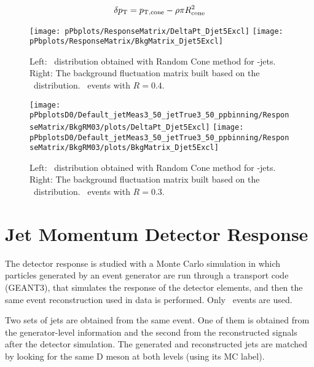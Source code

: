 \begin{equation}
\delta p_{\rm T} = p_{\rm T, cone} - \rho \pi R_{\rm cone}^{2}
\label{edeltapt}
\end{equation}

\begin{figure}[bth]
\centering
\texttt{[image: pPbplots/ResponseMatrix/DeltaPt\_Djet5Excl]}
\texttt{[image: pPbplots/ResponseMatrix/BkgMatrix\_Djet5Excl]}
\caption{Left: \deltapt\ distribution obtained with Random Cone method for \Dstar-jets. Right: The background fluctuation matrix built based on the \deltapt\ distribution. \pPb\ events with $R=0.4$.}
\label{fig:DeltaPt_Dstar}
\end{figure}

\begin{figure}[bth]
\centering
\texttt{[image: pPbplotsD0/Default\_jetMeas3\_50\_jetTrue3\_50\_ppbinning/ResponseMatrix/BkgRM03/plots/DeltaPt\_Djet5Excl]}
\texttt{[image: pPbplotsD0/Default\_jetMeas3\_50\_jetTrue3\_50\_ppbinning/ResponseMatrix/BkgRM03/plots/BkgMatrix\_Djet5Excl]}
\caption{Left: \deltapt\ distribution obtained with Random Cone method for \Dzero-jets. Right: The background fluctuation matrix built based on the \deltapt\ distribution. \pPb\ events with $R=0.3$.}
\label{fig:DeltaPt_Dzero}
\end{figure}



\section{Jet Momentum Detector Response}

The detector response is studied with a Monte Carlo simulation in which particles generated by an event generator are
run through a transport code (GEANT3), that simulates the response of the detector elements, and then the same event reconstruction used in data is performed. Only \ccbar\ events are used.

Two sets of jets are obtained from the same event. One of them is obtained from the generator-level information and the second from the reconstructed signals after the detector simulation. 
The generated and reconstructed jets are matched by looking for the same D meson at both levels (using its MC label).


